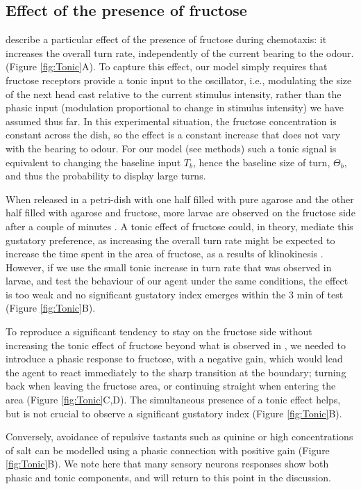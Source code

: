 \documentclass[11pt,a4paper]{article}
\begin{document}
\subsection{Effect of the presence of fructose}
\cite{schleyer2015learning} describe a particular effect of the presence of fructose during chemotaxis: it increases the overall turn rate, independently of the current bearing to the odour. (Figure \ref{fig:Tonic}A). To capture this effect, our model simply requires that fructose receptors provide a tonic input to the oscillator, i.e., modulating the size of the next head cast relative to the current stimulus intensity, rather than the phasic input (modulation proportional to change in stimulus intensity) we have assumed thus far. In this experimental situation, the fructose concentration is constant across the dish, so the effect is a constant increase that does not vary with the bearing to odour. For our model (see methods) such a tonic signal is equivalent to changing the baseline input $T_b$, hence the baseline size of turn, $\Theta_b$, and thus the probability to display large turns. 

When released in a petri-dish with one half filled with pure agarose and the other half filled with agarose and fructose, more larvae are observed on the fructose side after a couple of minutes \citep{schleyer2011behavior}. A tonic effect of fructose could, in theory, mediate this gustatory preference, as increasing the overall turn rate might be expected to increase the time spent in the area of fructose, as a results of klinokinesis \citep{}. However, if we use the small tonic increase in turn rate that was observed in larvae, and test the behaviour of our agent under the same conditions, the effect is too weak and no significant gustatory index emerges within the 3 min of test (Figure \ref{fig:Tonic}B).

 To reproduce a significant tendency to stay on the fructose side without increasing the tonic effect of fructose beyond what is observed in \cite{schleyer2015learning}, we needed to introduce a phasic response to fructose, with a negative gain, which would lead the agent to react immediately to the sharp transition at the boundary; turning back when leaving the fructose area, or continuing straight when entering the area (Figure \ref{fig:Tonic}C,D). The simultaneous presence of a tonic effect helps, but is not crucial to observe a significant gustatory index (Figure \ref{fig:Tonic}B).

  Conversely, avoidance of repulsive tastants such as quinine or high concentrations of salt \citep{schleyer2011behavior} can be modelled using a phasic connection with positive gain (Figure \ref{fig:Tonic}B). We note here that many sensory neurons responses show both phasic and tonic components, and will return to this point in the discussion.
\end{document}
